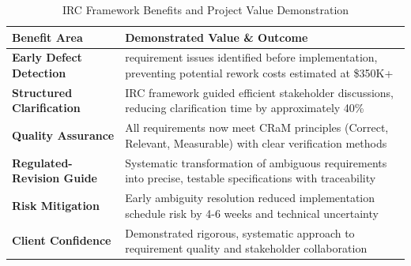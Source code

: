 \documentclass[12pt,a4paper]{article}
\begin{document}
\begin{table}[H]
\centering
\small
\renewcommand{\arraystretch}{1.3}
\begin{tabular}{|>{\raggedright\arraybackslash}p{}|>{\raggedright\arraybackslash}p{}|}
\hline
\rowcolor{tableheader}
\textbf{Benefit Area} & \textbf{Demonstrated Value \& Outcome} \\
\hline
\textbf{Early Defect Detection} & 15 requirement issues identified before implementation, preventing potential rework costs estimated at \$350K+ \\
\hline
\textbf{Structured Clarification} & IRC framework guided efficient stakeholder discussions, reducing clarification time by approximately 40\% \\
\hline
\textbf{Quality Assurance} & All requirements now meet CRaM principles (Correct, Relevant, Measurable) with clear verification methods \\
\hline
\textbf{Regulated-Revision Guide} & Systematic transformation of ambiguous requirements into precise, testable specifications with traceability \\
\hline
\textbf{Risk Mitigation} & Early ambiguity resolution reduced implementation schedule risk by 4-6 weeks and technical uncertainty \\
\hline
\textbf{Client Confidence} & Demonstrated rigorous, systematic approach to requirement quality and stakeholder collaboration \\
\hline
\end{tabular}
\caption{IRC Framework Benefits and Project Value Demonstration}
\end{table}
\end{document}
